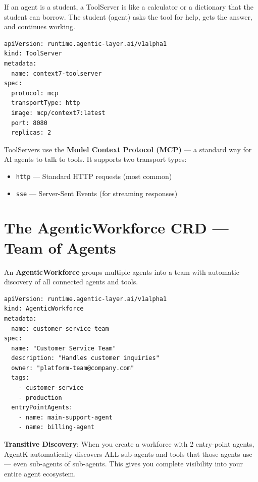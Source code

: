 \documentclass[12pt,a4paper,openany]{report}
\begin{document}
\begin{analogybox}
If an agent is a student, a ToolServer is like a calculator or a dictionary that the student can borrow. The student (agent) asks the tool for help, gets the answer, and continues working.
\end{analogybox}

\begin{lstlisting}[style=yaml, caption={A ToolServer for code documentation}]
apiVersion: runtime.agentic-layer.ai/v1alpha1
kind: ToolServer
metadata:
  name: context7-toolserver
spec:
  protocol: mcp
  transportType: http
  image: mcp/context7:latest
  port: 8080
  replicas: 2
\end{lstlisting}

ToolServers use the \textbf{Model Context Protocol (MCP)} — a standard way for AI agents to talk to tools. It supports two transport types:
\begin{itemize}
    \item \texttt{http} — Standard HTTP requests (most common)
    \item \texttt{sse} — Server-Sent Events (for streaming responses)
\end{itemize}

\section{The AgenticWorkforce CRD — Team of Agents}

An \textbf{AgenticWorkforce} groups multiple agents into a team with automatic discovery of all connected agents and tools.

\begin{lstlisting}[style=yaml, caption={An agentic workforce}]
apiVersion: runtime.agentic-layer.ai/v1alpha1
kind: AgenticWorkforce
metadata:
  name: customer-service-team
spec:
  name: "Customer Service Team"
  description: "Handles customer inquiries"
  owner: "platform-team@company.com"
  tags:
    - customer-service
    - production
  entryPointAgents:
    - name: main-support-agent
    - name: billing-agent
\end{lstlisting}

\begin{keyconceptbox}
\textbf{Transitive Discovery}: When you create a workforce with 2 entry-point agents, AgentK automatically discovers ALL sub-agents and tools that those agents use — even sub-agents of sub-agents. This gives you complete visibility into your entire agent ecosystem.
\end{keyconceptbox}
\end{document}

